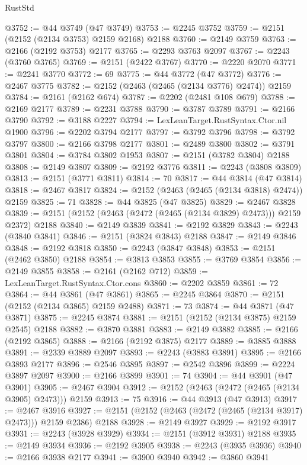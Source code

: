 \begin{lexlean}{RustStd}
\begin{coremodule}
@3752 := @44 @3749 (@47 @3749)
@3753 := @2245 @3752
@3759 := @2151 (@2152 (@2134 @3753) @2159 @2168) @2188
@3760 := @2149 @3759
@3763 := @2166 (@2192 @3753) @2177
@3765 := @2293 @3763 @2097
@3767 := @2243 (@3760 @3765)
@3769 := @2151 (@2422 @3767)
@3770 := @2220 @2070
@3771 := @2241 @3770
@3772 := 69
@3775 := @44 @3772 (@47 @3772)
@3776 := @2467 @3775
@3782 := @2152 (@2463 (@2465 (@2134 @3776) @2474)) @2159
@3784 := @2161 (@2162 @674)
@3787 := @2202 (@2481 @108 @679)
@3788 := @2169 @2177
@3789 := @2231 @3788
@3790 := @3787 @3789
@3791 := @2166 @3790
@3792 := @3188 @2227
@3794 := LexLeanTarget.RustSyntax.Ctor.nil @1900
@3796 := @2202 @3794 @2177
@3797 := @3792 @3796
@3798 := @3792 @3797
@3800 := @2166 @3798 @2177
@3801 := @2489 @3800
@3802 := @3791 @3801
@3804 := @3784 @3802 @1953
@3807 := @2151 (@3782 @3804) @2188
@3808 := @2149 @3807
@3809 := @2192 @3776
@3811 := @2243 (@3808 @3809)
@3813 := @2151 (@3771 @3811)
@3814 := 70
@3817 := @44 @3814 (@47 @3814)
@3818 := @2467 @3817
@3824 := @2152 (@2463 (@2465 (@2134 @3818) @2474)) @2159
@3825 := 71
@3828 := @44 @3825 (@47 @3825)
@3829 := @2467 @3828
@3839 := @2151 (@2152 (@2463 (@2472 (@2465 (@2134 @3829) @2473))) @2159 @2372) @2188
@3840 := @2149 @3839
@3841 := @2192 @3829
@3843 := @2243 (@3840 @3841)
@3846 := @2151 (@3824 @3843) @2188
@3847 := @2149 @3846
@3848 := @2192 @3818
@3850 := @2243 (@3847 @3848)
@3853 := @2151 (@2462 @3850) @2188
@3854 := @3813 @3853
@3855 := @3769 @3854
@3856 := @2149 @3855
@3858 := @2161 (@2162 @712)
@3859 := LexLeanTarget.RustSyntax.Ctor.cons
@3860 := @2202 @3859
@3861 := 72
@3864 := @44 @3861 (@47 @3861)
@3865 := @2245 @3864
@3870 := @2151 (@2152 (@2134 @3865) @2159 @2488)
@3871 := 73
@3874 := @44 @3871 (@47 @3871)
@3875 := @2245 @3874
@3881 := @2151 (@2152 (@2134 @3875) @2159 @2545) @2188
@3882 := @3870 @3881
@3883 := @2149 @3882
@3885 := @2166 (@2192 @3865)
@3888 := @2166 (@2192 @3875) @2177
@3889 := @3885 @3888
@3891 := @2339 @3889 @2097
@3893 := @2243 (@3883 @3891)
@3895 := @2166 @3893 @2177
@3896 := @2546 @3895
@3897 := @2542 @3896
@3899 := @2224 @3897 @2097
@3900 := @2166 @3899
@3901 := 74
@3904 := @44 @3901 (@47 @3901)
@3905 := @2467 @3904
@3912 := @2152 (@2463 (@2472 (@2465 (@2134 @3905) @2473))) @2159
@3913 := 75
@3916 := @44 @3913 (@47 @3913)
@3917 := @2467 @3916
@3927 := @2151 (@2152 (@2463 (@2472 (@2465 (@2134 @3917) @2473))) @2159 @2386) @2188
@3928 := @2149 @3927
@3929 := @2192 @3917
@3931 := @2243 (@3928 @3929)
@3934 := @2151 (@3912 @3931) @2188
@3935 := @2149 @3934
@3936 := @2192 @3905
@3938 := @2243 (@3935 @3936)
@3940 := @2166 @3938 @2177
@3941 := @3900 @3940
@3942 := @3860 @3941

\end{coremodule}
\end{lexlean}
